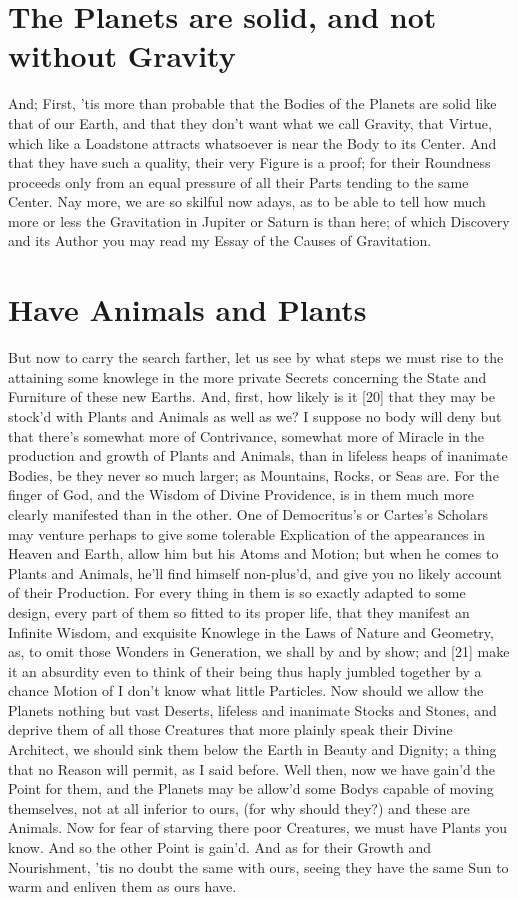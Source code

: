 \documentclass[letterpaper]{book}
\begin{document}
\section{The Planets are solid, and not without Gravity}

And; First, 'tis more than probable that the Bodies of the Planets are solid
like that of our Earth, and that they don't want what we call Gravity, that
Virtue, which like a Loadstone attracts whatsoever is near the Body to its
Center. And that they have such a quality, their very Figure is a proof; for
their Roundness proceeds only from an equal pressure of all their Parts
tending to the same Center. Nay more, we are so skilful now adays, as to be
able to tell how much more or less the Gravitation in Jupiter or Saturn is
than here; of which Discovery and its Author you may read my Essay of the
Causes of Gravitation.


\section{Have Animals and Plants}

But now to carry the search farther, let us see by what steps we must rise
to the attaining some knowlege in the more private Secrets concerning the
State and Furniture of these new Earths. And, first, how likely is it [20]
that they may be stock'd with Plants and Animals as well as we? I suppose no
body will deny but that there's somewhat more of Contrivance, somewhat
more of Miracle in the production and growth of Plants and Animals, than in
lifeless heaps of inanimate Bodies, be they never so much larger; as
Mountains, Rocks, or Seas are. For the finger of God, and the Wisdom of
Divine Providence, is in them much more clearly manifested than in the
other. One of Democritus's or Cartes's Scholars may venture perhaps to give
some tolerable Explication of the appearances in Heaven and Earth, allow him
but his Atoms and Motion; but when he comes to Plants and Animals, he'll
find himself non-plus'd, and give you no likely account of their Production.
For every thing in them is so exactly adapted to some design, every part of
them so fitted to its proper life, that they manifest an Infinite Wisdom,
and exquisite Knowlege in the Laws of Nature and Geometry, as, to omit those
Wonders in Generation, we shall by and by show; and [21] make it an
absurdity even to think of their being thus haply jumbled together by a
chance Motion of I don't know what little Particles. Now should we allow the
Planets nothing but vast Deserts, lifeless and inanimate Stocks and Stones,
and deprive them of all those Creatures that more plainly speak their Divine
Architect, we should sink them below the Earth in Beauty and Dignity; a
thing that no Reason will permit, as I said before.  Well then, now we have
gain'd the Point for them, and the Planets may be allow'd some Bodys capable
of moving themselves, not at all inferior to ours, (for why should they?)
and these are Animals. Now for fear of starving there poor Creatures, we
must have Plants you know. And so the other Point is gain'd. And as for
their Growth and Nourishment, 'tis no doubt the same with ours, seeing they
have the same Sun to warm and enliven them as ours have.
\end{document}
